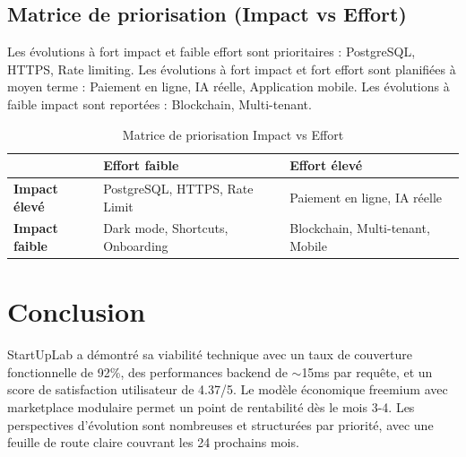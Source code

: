 \subsection{Matrice de priorisation (Impact vs Effort)}

Les évolutions à fort impact et faible effort sont prioritaires : PostgreSQL, HTTPS, Rate limiting. Les évolutions à fort impact et fort effort sont planifiées à moyen terme : Paiement en ligne, IA réelle, Application mobile. Les évolutions à faible impact sont reportées : Blockchain, Multi-tenant.

\begin{table}[H]
\centering
\caption{Matrice de priorisation Impact vs Effort}
\label{tab:prioritization}
\begin{tabular}{|l|l|l|}
\hline
& \textbf{Effort faible} & \textbf{Effort élevé} \\
\hline
\textbf{Impact élevé} & PostgreSQL, HTTPS, Rate Limit & Paiement en ligne, IA réelle \\
\hline
\textbf{Impact faible} & Dark mode, Shortcuts, Onboarding & Blockchain, Multi-tenant, Mobile \\
\hline
\end{tabular}
\end{table}

\section*{Conclusion}

StartUpLab a démontré sa viabilité technique avec un taux de couverture fonctionnelle de 92\%, des performances backend de $\sim$15ms par requête, et un score de satisfaction utilisateur de 4.37/5. Le modèle économique freemium avec marketplace modulaire permet un point de rentabilité dès le mois 3-4. Les perspectives d'évolution sont nombreuses et structurées par priorité, avec une feuille de route claire couvrant les 24 prochains mois.
